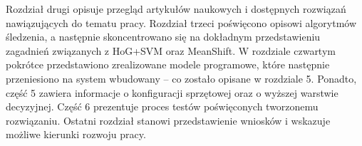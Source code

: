Rozdział drugi opisuje przegląd artykułów naukowych i dostępnych rozwiązań nawiązujących do tematu pracy.
Rozdział trzeci poświęcono opisowi algorytmów śledzenia, a następnie skoncentrowano się na dokładnym przedstawieniu zagadnień związanych z HoG+SVM oraz MeanShift. %
W rozdziale czwartym pokrótce przedstawiono zrealizowane modele programowe, które następnie przeniesiono na system wbudowany -- co zostało opisane w rozdziale 5.
Ponadto, część 5 zawiera informacje o konfiguracji sprzętowej oraz o wyższej warstwie decyzyjnej. 
Część 6 prezentuje proces testów poświęconych tworzonemu rozwiązaniu. 
Ostatni rozdział stanowi przedstawienie wniosków i wskazuje możliwe kierunki rozwoju pracy.












